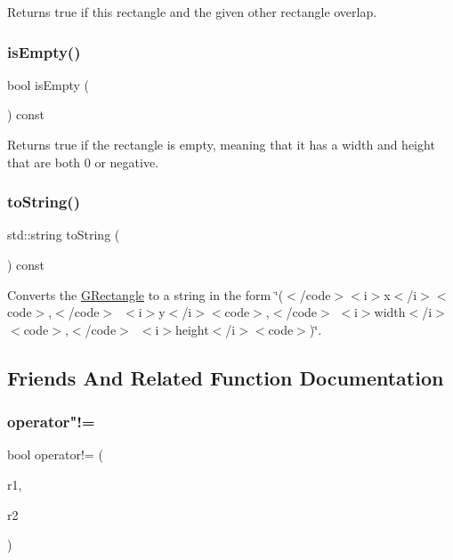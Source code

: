 Returns true if this rectangle and the given other rectangle overlap. 

\mbox{\label{structGRectangle_acf82f9b2937375c7b1cf3dccb3df3312}} 
\subsubsection{\texorpdfstring{is\+Empty()}{isEmpty()}}
{\footnotesize\ttfamily bool is\+Empty (\begin{DoxyParamCaption}{ }\end{DoxyParamCaption}) const}



Returns {\ttfamily true} if the rectangle is empty, meaning that it has a width and height that are both 0 or negative. 

\mbox{\label{structGRectangle_a1fe5121d6528fdea3f243321b3fa3a49}} 
\subsubsection{\texorpdfstring{to\+String()}{toString()}}
{\footnotesize\ttfamily std\+::string to\+String (\begin{DoxyParamCaption}{ }\end{DoxyParamCaption}) const}



Converts the {\ttfamily \mbox{\hyperlink{structGRectangle}{G\+Rectangle}}} to a string in the form {\ttfamily \char`\"{}($<$/code$>$$<$i$>$x$<$/i$>$$<$code$>$,$<$/code$>$~$<$i$>$y$<$/i$>$$<$code$>$,$<$/code$>$
$<$i$>$width$<$/i$>$$<$code$>$,$<$/code$>$~$<$i$>$height$<$/i$>$$<$code$>$)\char`\"{}}. 



\subsection{Friends And Related Function Documentation}
\mbox{\label{structGRectangle_ab1f9c96d97d7895bcd908ba94af3bed7}} 
\subsubsection{\texorpdfstring{operator"!=}{operator!=}}
{\footnotesize\ttfamily bool operator!= (\begin{DoxyParamCaption}\item[{const \mbox{\hyperlink{structGRectangle}{G\+Rectangle}} \&}]{r1,  }\item[{const \mbox{\hyperlink{structGRectangle}{G\+Rectangle}} \&}]{r2 }\end{DoxyParamCaption})\hspace{0.3cm}{\ttfamily [friend]}}



